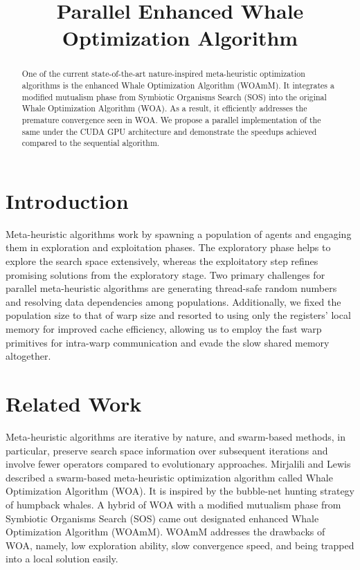 \documentclass[conference]{IEEEtran}
\begin{document}
\title{Parallel Enhanced Whale Optimization Algorithm}

\author{
}

\maketitle

\begin{abstract}

    One of the current state-of-the-art nature-inspired meta-heuristic optimization algorithms is the enhanced Whale Optimization Algorithm (WOAmM). 
    It integrates a modified mutualism phase from Symbiotic Organisms Search (SOS) into the original Whale Optimization Algorithm (WOA). 
    As a result, it efficiently addresses the premature convergence seen in WOA. 
    We propose a parallel implementation of the same under the CUDA GPU architecture and demonstrate the speedups achieved compared to the sequential algorithm.

\end{abstract}

\section{Introduction}
\label{intro}

Meta-heuristic algorithms work by spawning a population of agents and engaging them in exploration and exploitation phases. 
The exploratory phase helps to explore the search space extensively, whereas the exploitatory step refines promising solutions from the exploratory stage. 
Two primary challenges for parallel meta-heuristic algorithms are generating thread-safe random numbers and resolving data dependencies among populations. 
Additionally, we fixed the population size to that of warp size and resorted to using only the registers’ local memory for improved cache efficiency, 
allowing us to employ the fast warp primitives for intra-warp communication and evade the slow shared memory altogether.

\section{Related Work}

Meta-heuristic algorithms are iterative by nature, and swarm-based methods, in particular, 
preserve search space information over subsequent iterations and involve fewer operators compared to evolutionary approaches. 
Mirjalili and Lewis \cite{MIRJALILI201651} described a swarm-based meta-heuristic optimization algorithm called Whale Optimization Algorithm (WOA). 
It is inspired by the bubble-net hunting strategy of humpback whales. 
A hybrid of WOA with a modified mutualism phase from Symbiotic Organisms Search (SOS) came out designated enhanced Whale Optimization Algorithm (WOAmM)\cite{CHAKRABORTY2021107086}. 
WOAmM addresses the drawbacks of WOA, namely, low exploration ability, slow convergence speed, and being trapped into a local solution easily.
\end{document}

